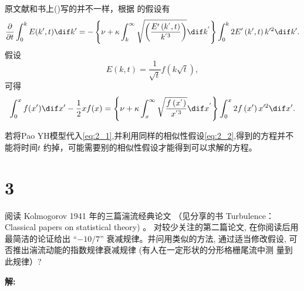 \documentclass[12pt,a4]{ctexart}
\begin{document}
原文献和书上(\cite{shi})写的并不一样，根据 \cite{10.2307/98337} 的假设有
\begin{equation}
   \frac{\partial}{\partial t} \int_{0}^{k} E(k', t) \dif  k'=-\left\{\nu+\kappa \int_{k}^{\infty} \sqrt{\left(\frac{E^{\prime}\left(k^{'}, t\right)}{k^{' 3}}\right)} \dif  k^{'}\right\} \int_{0}^{k} 2 E^{\prime}\left(k^{\prime}, t\right) k^{\prime 2} \dif k^{\prime} .
\end{equation}
假设
\begin{equation}
   E(k,t) = \frac{1}{\sqrt{t} } f(k\sqrt{t}),
   \label{eq:2_2}
\end{equation}
可得
\begin{equation}
   \int_{0}^{x} f(x') \dif x'-\frac{1}{2} x f(x)=\left\{\nu+\kappa \int_{x}^{\infty} \sqrt{\frac{f\left(x^{'}\right)}{x^{' 3}}}  \dif x^{'}\right\} \int_{0}^{x} 2 f\left(x^{\prime}\right) x^{\prime 2} \dif x^{\prime}.
\end{equation}

若将Pao YH模型代入\cref{eq:2_1},并利用同样的相似性假设\cref{eq:2_2},得到的方程并不能将时间$t$ 约掉，可能需要别的相似性假设才能得到可以求解的方程。



\section{3}

阅读 Kolmogorov 1941 年的三篇湍流经典论文 \citep{kolmogorov1941dit} （见分享的书 Turbulence： Classical papers on statistical theory) 。 对较少关注的第二篇论文, 在你阅读后用 最简洁的论证给出 “$-10/7$” 衰减规律。并问用类似的方法, 通过适当修改假设, 可否推出湍流动能的指数规律衰减规律 (有人在一定形状的分形格栅尾流中测 量到此规律）?

\textsf{\hspace{-2em}\sf  \textbf{解:}}
\end{document}
